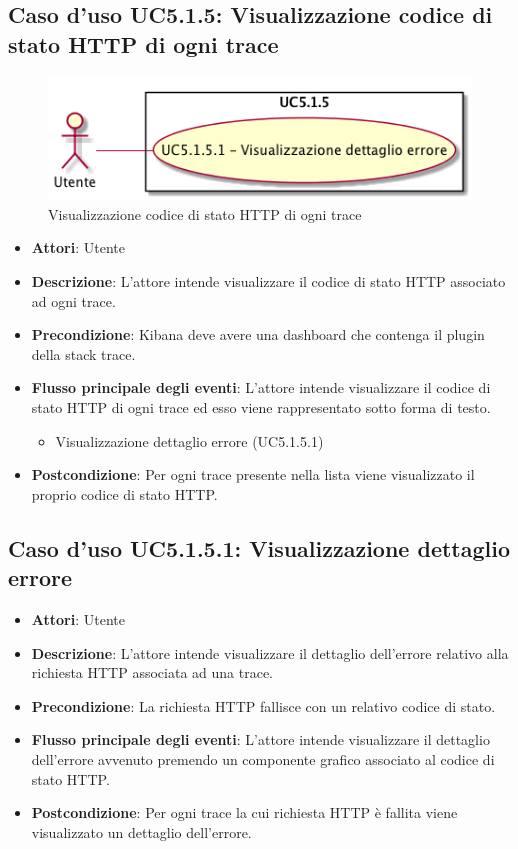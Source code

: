 \subsection{Caso d'uso UC5.1.5: Visualizzazione codice di stato HTTP di ogni trace}
\begin{figure} [H]
	\centering
	\includegraphics[scale=0.45]{./UC/UC5-1-5.png}
	\caption{Visualizzazione codice di stato HTTP di ogni trace}\label{}
\end{figure}
\begin{itemize}
	\item \textbf{Attori}: Utente
	\item \textbf{Descrizione}: L'attore intende visualizzare il codice di stato HTTP associato ad ogni trace.
	\item \textbf{Precondizione}: Kibana deve avere una dashboard che contenga il plugin della stack trace.
	\item \textbf{Flusso principale degli eventi}: L'attore intende visualizzare il codice di stato HTTP di ogni trace ed esso viene rappresentato sotto forma di testo.
	\begin{itemize}
		\item Visualizzazione dettaglio errore (UC5.1.5.1)
	\end{itemize}
	\item \textbf{Postcondizione}: Per ogni trace presente nella lista viene visualizzato il proprio codice di stato HTTP.
\end{itemize}
\subsection{Caso d'uso UC5.1.5.1: Visualizzazione dettaglio errore}
\begin{itemize}
	\item \textbf{Attori}: Utente
	\item \textbf{Descrizione}: L'attore intende visualizzare il dettaglio dell'errore relativo alla richiesta HTTP associata ad una trace.
	\item \textbf{Precondizione}: La richiesta HTTP fallisce con un relativo codice di stato.
	\item \textbf{Flusso principale degli eventi}: L'attore intende visualizzare il dettaglio dell'errore avvenuto premendo un componente grafico associato al codice di stato HTTP.
	
	\item \textbf{Postcondizione}: Per ogni trace la cui richiesta HTTP è fallita viene visualizzato un dettaglio dell'errore.
\end{itemize}
